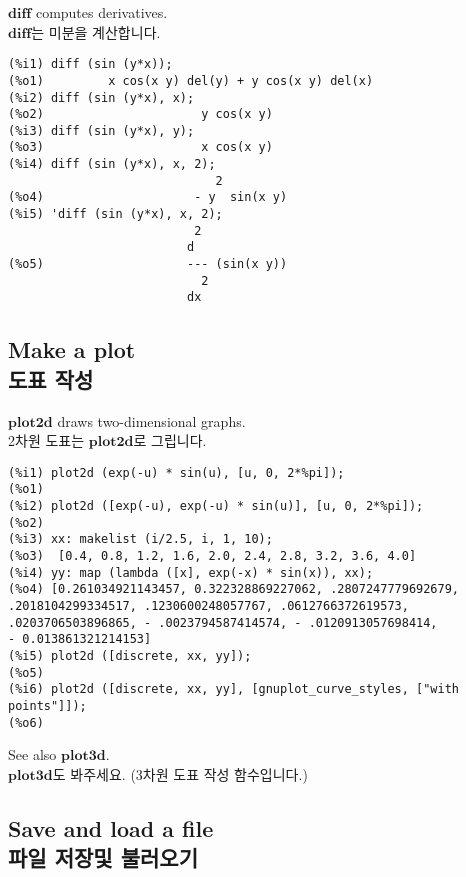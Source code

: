 \documentclass[12pt]{article}
\begin{document}
$\mathbf{diff}$ computes derivatives. \\
$\mathbf{diff}$는 미분을 계산합니다.

\begin{verbatim}
(%i1) diff (sin (y*x));
(%o1)         x cos(x y) del(y) + y cos(x y) del(x)
(%i2) diff (sin (y*x), x);
(%o2)                      y cos(x y)
(%i3) diff (sin (y*x), y);
(%o3)                      x cos(x y)
(%i4) diff (sin (y*x), x, 2);
                             2
(%o4)                     - y  sin(x y)
(%i5) 'diff (sin (y*x), x, 2);
                          2
                         d
(%o5)                    --- (sin(x y))
                           2
                         dx
\end{verbatim}

\subsection{Make a plot \\ 도표 작성}

$\mathbf{plot2d}$ draws two-dimensional graphs. \\
2차원 도표는 $\mathbf{plot2d}$로 그립니다.

\begin{verbatim}
(%i1) plot2d (exp(-u) * sin(u), [u, 0, 2*%pi]);
(%o1) 
(%i2) plot2d ([exp(-u), exp(-u) * sin(u)], [u, 0, 2*%pi]);
(%o2) 
(%i3) xx: makelist (i/2.5, i, 1, 10);
(%o3)  [0.4, 0.8, 1.2, 1.6, 2.0, 2.4, 2.8, 3.2, 3.6, 4.0]
(%i4) yy: map (lambda ([x], exp(-x) * sin(x)), xx);
(%o4) [0.261034921143457, 0.322328869227062, .2807247779692679, 
.2018104299334517, .1230600248057767, .0612766372619573, 
.0203706503896865, - .0023794587414574, - .0120913057698414, 
- 0.013861321214153]
(%i5) plot2d ([discrete, xx, yy]);
(%o5) 
(%i6) plot2d ([discrete, xx, yy], [gnuplot_curve_styles, ["with points"]]);
(%o6)
\end{verbatim}

See also $\mathbf{plot3d}$. \\
$\mathbf{plot3d}$도 봐주세요. (3차원 도표 작성 함수입니다.)

\subsection{Save and load a file \\ 파일 저장및 불러오기}
\end{document}
